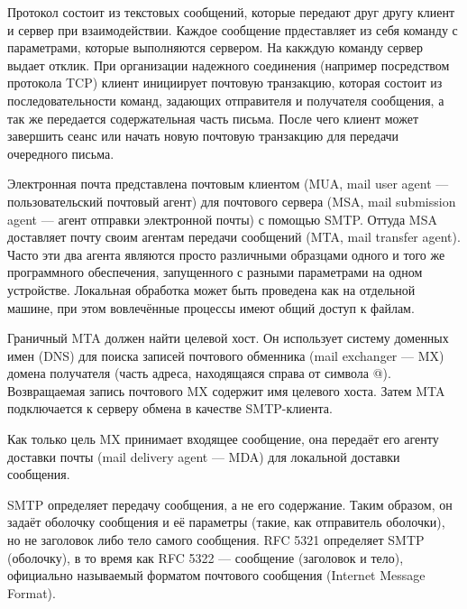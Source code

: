 \documentclass[a4paper,12pt]{report}
\begin{document}
	 Протокол состоит из текстовых сообщений, которые передают друг другу клиент и сервер при взаимодействии. Каждое сообщение прдеставляет из себя команду с параметрами, которые выполняются сервером. На какждую команду сервер выдает отклик. При организации надежного соединения (например посредством протокола TCP) клиент инициирует почтовую транзакцию, которая состоит из последовательности команд, задающих отправителя и получателя сообщения, а так же передается содержательная часть письма. После чего клиент может завершить сеанс или начать новую почтовую транзакцию для передачи очередного письма.

Электронная почта представлена почтовым клиентом (MUA, mail user agent — пользовательский почтовый агент) для почтового сервера (MSA, mail submission agent — агент отправки электронной почты) с помощью SMTP. Оттуда MSA доставляет почту своим агентам передачи сообщений (MTA, mail transfer agent). Часто эти два агента являются просто различными образцами одного и того же программного обеспечения, запущенного с разными параметрами на одном устройстве. Локальная обработка может быть проведена как на отдельной машине, при этом вовлечённые процессы имеют общий доступ к файлам. 

Граничный MTA должен найти целевой хост. Он использует систему доменных имен (DNS) для поиска записей почтового обменника (mail exchanger — MX) домена получателя (часть адреса, находящаяся справа от символа @). Возвращаемая запись почтового MX содержит имя целевого хоста. Затем MTA подключается к серверу обмена в качестве SMTP-клиента.

Как только цель MX принимает входящее сообщение, она передаёт его агенту доставки почты (mail delivery agent — MDA) для локальной доставки сообщения.

SMTP определяет передачу сообщения, а не его содержание. Таким образом, он задаёт оболочку сообщения и её параметры (такие, как отправитель оболочки), но не заголовок либо тело самого сообщения. RFC 5321 определяет SMTP (оболочку), в то время как RFC 5322 — сообщение (заголовок и тело), официально называемый форматом почтового сообщения (Internet Message Format).
\end{document}
